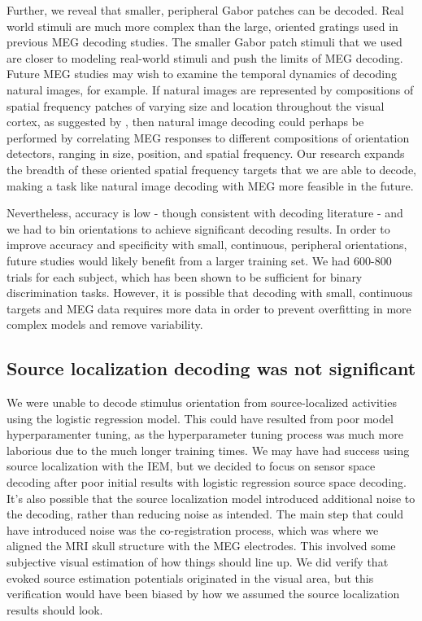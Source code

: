 \documentclass[../main.tex]{subfiles}
\begin{document}
Further, we reveal that smaller, peripheral Gabor patches can be decoded. Real world stimuli are much more complex than the large, oriented gratings used in previous MEG decoding studies. The smaller Gabor patch stimuli that we used are closer to modeling real-world stimuli and push the limits of MEG decoding. Future MEG studies may wish to examine the temporal dynamics of decoding natural images, for example. If natural images are represented by compositions of spatial frequency patches of varying size and location throughout the visual cortex, as suggested by \cite{OLSHAUSEN19973311}, then natural image decoding could perhaps be performed by correlating MEG responses to different compositions of orientation detectors, ranging in size, position, and spatial frequency. Our research expands the breadth of these oriented spatial frequency targets that we are able to decode, making a task like natural image decoding with MEG more feasible in the future.

Nevertheless, accuracy is low - though consistent with decoding literature - and we had to bin orientations to achieve significant decoding results. In order to improve accuracy and specificity with small, continuous, peripheral orientations, future studies would likely benefit from a larger training set. We had 600-800 trials for each subject, which has been shown to be sufficient for binary discrimination tasks. However, it is possible that decoding with small, continuous targets and MEG data requires more data in order to  prevent overfitting in more complex models and remove variability.

\subsection*{Source localization decoding was not significant}
We were unable to decode stimulus orientation from source-localized activities using the logistic regression model. This could have resulted from poor model hyperparamenter tuning, as the hyperparameter tuning process was much more laborious due to the much longer training times. We may have had success using source localization with the IEM, but we decided to focus on sensor space decoding after poor initial results with logistic regression source space decoding. It's also possible that the source localization model introduced additional noise to the decoding, rather than reducing noise as intended. The main step that could have introduced noise was the co-registration process, which was where we aligned the MRI skull structure with the MEG electrodes. This involved some subjective visual estimation of how things should line up. We did verify that evoked source estimation potentials originated in the visual area, but this verification would have been biased by how we assumed the source localization results should look.
\end{document}
